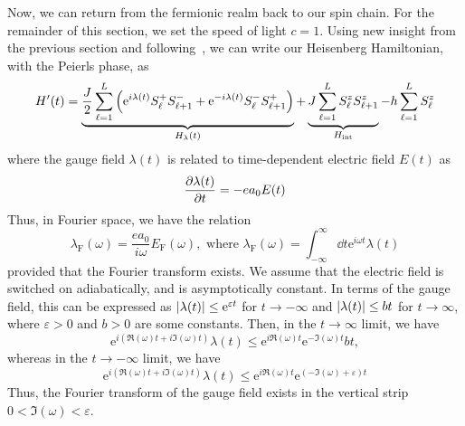 Now, we can return from the fermionic realm back to our spin chain. For the remainder of this section, we set
the speed of light \(c = 1\). Using new insight from the previous section and following~\textcite{Gohmann2022}, we can write our Heisenberg
Hamiltonian, with the Peierls phase, as
\begin{equation}
    H^{\prime}(t) = \underbrace{\frac{J}{2} \sum_{\ell=1}^{L} \left(\mathrm{e}^{i \lambda(t)} S^{+}_{\ell} S^{-}_{\ell+1} + \mathrm{e}^{-i \lambda(t)} S^{-}_{\ell}S^{+}_{\ell+1} \right)}_{H_{\lambda }(t)}
    + \underbrace{J \sum_{\ell=1}^{L} S^{z}_{\ell}S^{z}_{\ell+1}}_{H_{\text{int}}}
    - h \sum_{\ell=1}^{L} S^{z}_{\ell}
\end{equation}
where the gauge field \(\lambda(t)\) is related to time-dependent electric field \(E(t)\) as
\begin{equation}
    \pdv{\lambda(t)}{t} = - e a_0 E(t)
\end{equation}
Thus, in Fourier space, we have the relation
\begin{equation}
    \lambda_{\mathrm{F}} (\omega) = \frac{e a_0}{i \omega} E_{\mathrm{F}} (\omega), \text{ where } \lambda_{\mathrm{F}} (\omega) = \int_{-\infty}^{\infty} \dd{t} \mathrm{e}^{i \omega t} \lambda(t)
\end{equation}
provided that the Fourier transform exists. We assume that the electric field is switched on adiabatically, and
is asymptotically constant. In terms of the gauge field, this can be expressed as
\(\abs{\lambda (t)} \leq \mathrm{e}^{\varepsilon t} \) for \(t\to -\infty \) and
\(\abs{\lambda (t)} \leq b t \) for \(t\to \infty \), where \(\varepsilon > 0\) and \(b>0\) are some constants.
Then, in the \( t \to \infty \) limit, we have \[\mathrm{e}^{i (\Re(\omega) t + i \Im(\omega) t )} \lambda (t)
    \leq \mathrm{e}^{i \Re (\omega) t}  \mathrm{e}^{- \Im (\omega)  t} b t,\]
whereas in the \(t \to -\infty \) limit,
we have \[\mathrm{e}^{i (\Re (\omega) t + i \Im (\omega) t )} \lambda (t) \leq \mathrm{e}^{i \Re (\omega) t}
    \mathrm{e}^{(- \Im (\omega) + \varepsilon )t}\]
Thus, the Fourier transform of the gauge field exists in the
vertical strip \(0 < \Im (\omega) < \varepsilon \).

